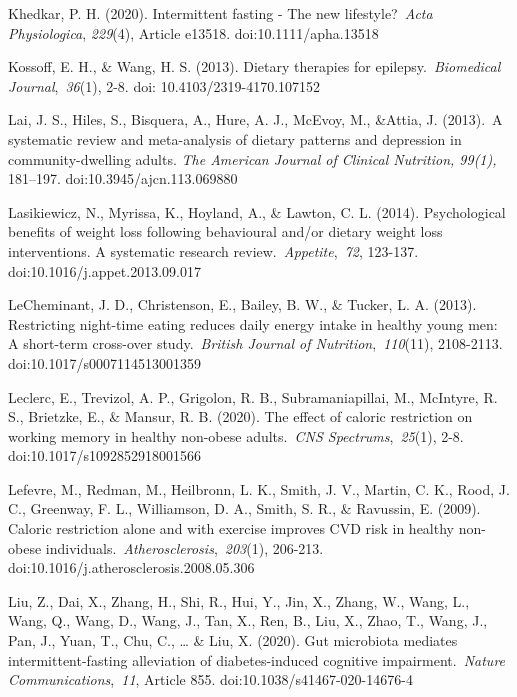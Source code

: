 \documentclass[authordate, empirical]{jote-new-article}
\begin{document}
Khedkar, P. H. (2020). Intermittent fasting - The new lifestyle? \emph{Acta Physiologica}, \emph{229}(4), Article e13518. doi:10.1111/apha.13518



Kossoff, E. H., \& Wang, H. S. (2013). Dietary therapies for epilepsy. \emph{Biomedical Journal}, \emph{36}(1), 2-8. doi: 10.4103/2319-4170.107152



Lai, J. S., Hiles, S., Bisquera, A., Hure, A. J., McEvoy, M., \&Attia, J. (2013). A systematic review and meta-analysis of dietary patterns and depression in community-dwelling adults.\emph{ The American Journal of Clinical Nutrition, 99(1), }181--197. doi:10.3945/ajcn.113.069880



Lasikiewicz, N., Myrissa, K., Hoyland, A., \& Lawton, C. L. (2014). Psychological benefits of weight loss following behavioural and/or dietary weight loss interventions. A systematic research review. \emph{Appetite}, \emph{72}, 123-137. doi:10.1016/j.appet.2013.09.017



LeCheminant, J. D., Christenson, E., Bailey, B. W., \& Tucker, L. A. (2013). Restricting night-time eating reduces daily energy intake in healthy young men: A short-term cross-over study. \emph{British Journal of Nutrition}, \emph{110}(11), 2108-2113. doi:10.1017/s0007114513001359



Leclerc, E., Trevizol, A. P., Grigolon, R. B., Subramaniapillai, M., McIntyre, R. S., Brietzke, E., \& Mansur, R. B. (2020). The effect of caloric restriction on working memory in healthy non-obese adults. \emph{CNS Spectrums}, \emph{25}(1), 2-8. doi:10.1017/s1092852918001566



Lefevre, M., Redman, M., Heilbronn, L. K., Smith, J. V., Martin, C. K., Rood, J. C., Greenway, F. L., Williamson, D. A., Smith, S. R., \& Ravussin, E. (2009). Caloric restriction alone and with exercise improves CVD risk in healthy non-obese individuals. \emph{Atherosclerosis}, \emph{203}(1), 206-213. doi:10.1016/j.atherosclerosis.2008.05.306



Liu, Z., Dai, X., Zhang, H., Shi, R., Hui, Y., Jin, X., Zhang, W., Wang, L., Wang, Q., Wang, D., Wang, J., Tan, X., Ren, B., Liu, X., Zhao, T., Wang, J., Pan, J., Yuan, T., Chu, C., … \& Liu, X. (2020). Gut microbiota mediates intermittent-fasting alleviation of diabetes-induced cognitive impairment. \emph{Nature Communications}, \emph{11}, Article 855. doi:10.1038/s41467-020-14676-4
\end{document}
